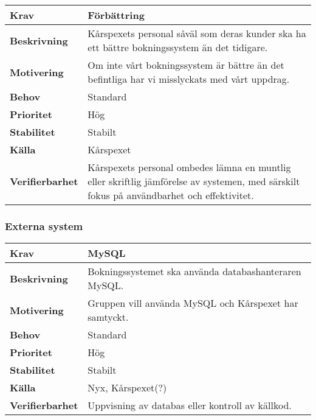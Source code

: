 \documentclass[a4paper, twoside, 11pt, titlepage]{article}
\begin{document}
		\begin{tabular} { p{2.6cm} p{12.5cm} }
			\hline
			\sffamily\textbf{Krav} & Förbättring  \\
			\hline
			\sffamily\textbf{Beskrivning} & Kårspexets personal såväl som deras kunder ska ha ett bättre bokningssystem än det tidigare.  \\
			\hline
			\sffamily\textbf{Motivering} & Om inte vårt bokningssystem är bättre än det befintliga har vi misslyckats med vårt uppdrag.  \\
			\hline
			\sffamily\textbf{Behov} & Standard  \\
			\hline
			\sffamily\textbf{Prioritet} & Hög  \\
			\hline
			\sffamily\textbf{Stabilitet} & Stabilt  \\
			\hline
			\sffamily\textbf{Källa} & Kårspexet  \\
			\hline
			\sffamily\textbf{Verifierbarhet} & Kårspexets personal ombedes lämna en muntlig eller skriftlig jämförelse av systemen, med särskilt fokus på användbarhet och effektivitet.  \\
			\hline
		\end{tabular}


		\subsubsection{Externa system}


		\begin{tabular} { p{2.6cm} p{12.5cm} }
			\hline
			\sffamily\textbf{Krav} & MySQL  \\
			\hline
			\sffamily\textbf{Beskrivning} & Bokningssystemet ska använda databashanteraren MySQL.  \\
			\hline
			\sffamily\textbf{Motivering} & Gruppen vill använda MySQL och Kårspexet har samtyckt.  \\
			\hline
			\sffamily\textbf{Behov} & Standard  \\
			\hline
			\sffamily\textbf{Prioritet} & Hög  \\
			\hline
			\sffamily\textbf{Stabilitet} & Stabilt  \\
			\hline
			\sffamily\textbf{Källa} & Nyx, Kårspexet(?)  \\
			\hline
			\sffamily\textbf{Verifierbarhet} & Uppvisning av databas eller kontroll av källkod.  \\
			\hline
		\end{tabular}
		\vspace{6mm}
\end{document}
